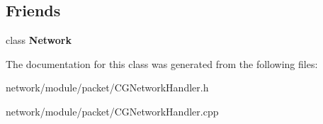 \subsection*{Friends}
\begin{DoxyCompactItemize}
\item 
\mbox{\label{class_c_g_1_1_c_g_network_handler_a88b59289ffd793fecd040d32e397b1e9}} 
class {\bfseries Network}
\end{DoxyCompactItemize}


The documentation for this class was generated from the following files\+:\begin{DoxyCompactItemize}
\item 
network/module/packet/C\+G\+Network\+Handler.\+h\item 
network/module/packet/C\+G\+Network\+Handler.\+cpp\end{DoxyCompactItemize}
